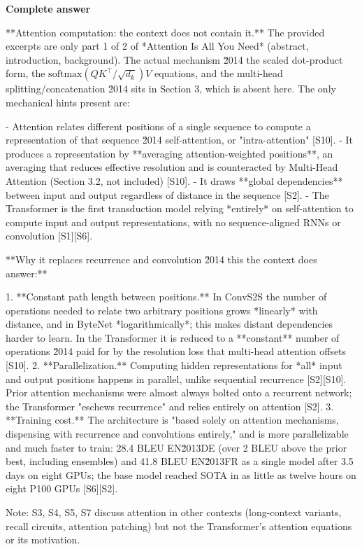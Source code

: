 \documentclass[10pt]{article}
\begin{document}
\textbf{Complete answer}
\begin{AnswerText}
**Attention computation: the context does not contain it.** The provided excerpts are only part 1 of 2 of *Attention Is All You Need* (abstract, introduction, background). The actual mechanism \u2014 the scaled dot-product form, the $\mathrm{softmax}(QK^\top/\sqrt{d_k})V$ equations, and the multi-head splitting/concatenation \u2014 sits in Section 3, which is absent here. The only mechanical hints present are:

- Attention relates different positions of a single sequence to compute a representation of that sequence \u2014 self-attention, or "intra-attention" [S10].
- It produces a representation by **averaging attention-weighted positions**, an averaging that reduces effective resolution and is counteracted by Multi-Head Attention (Section 3.2, not included) [S10].
- It draws **global dependencies** between input and output regardless of distance in the sequence [S2].
- The Transformer is the first transduction model relying *entirely* on self-attention to compute input and output representations, with no sequence-aligned RNNs or convolution [S1][S6].

**Why it replaces recurrence and convolution \u2014 this the context does answer:**

1. **Constant path length between positions.** In ConvS2S the number of operations needed to relate two arbitrary positions grows *linearly* with distance, and in ByteNet *logarithmically*; this makes distant dependencies harder to learn. In the Transformer it is reduced to a **constant** number of operations \u2014 paid for by the resolution loss that multi-head attention offsets [S10].
2. **Parallelization.** Computing hidden representations for *all* input and output positions happens in parallel, unlike sequential recurrence [S2][S10]. Prior attention mechanisms were almost always bolted onto a recurrent network; the Transformer "eschews recurrence" and relies entirely on attention [S2].
3. **Training cost.** The architecture is "based solely on attention mechanisms, dispensing with recurrence and convolutions entirely," and is more parallelizable and much faster to train: 28.4 BLEU EN\u2013DE (over 2 BLEU above the prior best, including ensembles) and 41.8 BLEU EN\u2013FR as a single model after 3.5 days on eight GPUs; the base model reached SOTA in as little as twelve hours on eight P100 GPUs [S6][S2].

Note: S3, S4, S5, S7 discuss attention in other contexts (long-context variants, recall circuits, attention patching) but not the Transformer's attention equations or its motivation.
\end{AnswerText}
\end{document}
